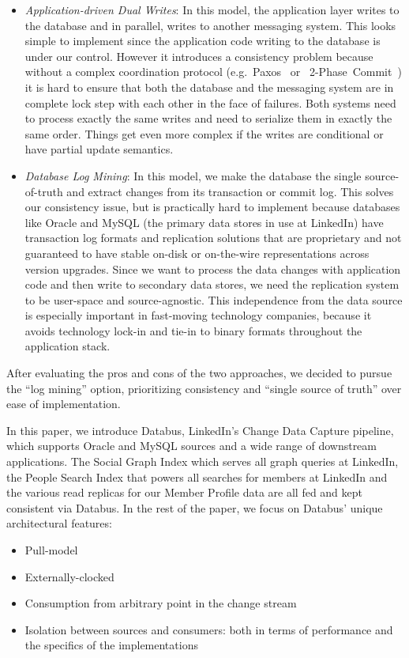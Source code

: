 \begin{itemize}
\item\emph{Application-driven Dual Writes}: In this model, the application layer writes to the database and in parallel, writes to another messaging system. This looks simple to implement since the application code writing to the database is under our control. However it introduces a consistency problem because without a complex coordination protocol (e.g.~Paxos~\cite{paxos} or ~2-Phase~Commit~\cite{Gray-1978}) it is hard to ensure that both the database and the messaging system are in complete lock step with each other in the face of failures. Both systems need to process exactly the same writes and need to serialize them in exactly the same order. Things get even more complex if the writes are conditional or have partial update semantics. 
\item\emph{Database Log Mining}: In this model, we make the database the single source-of-truth and extract changes from its transaction or commit log. This solves our consistency issue, but is practically hard to implement because databases like Oracle and MySQL (the primary data stores in use at LinkedIn) have transaction log formats and replication solutions that are proprietary and not guaranteed to have stable on-disk or on-the-wire representations across version upgrades. Since we want to process the data changes with application code and then write to secondary data stores, we need the replication system to be user-space and source-agnostic. This independence from the data source is especially important in fast-moving technology companies, because it avoids technology lock-in and tie-in to binary formats throughout the application stack.
\end{itemize}

After evaluating the pros and cons of the two approaches, we decided to pursue the ``log mining'' option, prioritizing consistency and ``single source of truth'' over ease of implementation. 

  
In this paper, we introduce Databus, LinkedIn's Change Data Capture pipeline, which supports Oracle and MySQL sources and a wide range of downstream applications. 
The Social Graph Index which serves all graph queries at LinkedIn, the People Search Index that powers all searches for members at LinkedIn and the various read replicas for our Member Profile data are all fed and kept consistent via Databus. 
In the rest of the paper, we focus on Databus' unique architectural features:
\begin{itemize}
\item{Pull-model}
\item{Externally-clocked}
\item{Consumption from arbitrary point in the change stream}
\item{Isolation between sources and consumers: both in terms of performance and the specifics of the implementations}
\end{itemize}

